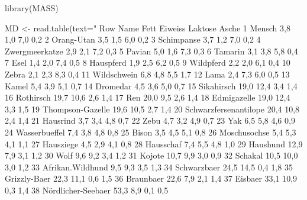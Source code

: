 \documentclass[letterpaper]{book}
\begin{document}
\begin{Examples}
\begin{ExampleCode}

library(MASS)

MD <- read.table(text="
Row  Name              Fett   Eiweiss Laktose Asche
  1  Mensch                  3,8      1,0       7,0      0,2
  2  Orang-Utan              3,5      1,5       6,0      0,2
  3  Schimpanse              3,7      1,2       7,0      0,2
  4  Zwergmeerkatze          2,9      2,1       7,2      0,3
  5  Pavian                  5,0      1,6       7,3      0,3
  6  Tamarin                 3,1      3,8       5,8      0,4
  7  Esel                    1,4      2,0       7,4      0,5
  8  Hauspferd               1,9      2,5       6,2      0,5
  9  Wildpferd               2,2      2,0       6,1      0,4
 10  Zebra                   2,1      2,3       8,3      0,4
 11  Wildschwein             6,8      4,8       5,5      1,7
 12  Lama                    2,4      7,3       6,0      0,5
 13  Kamel                   5,4      3,9       5,1      0,7
 14  Dromedar                4,5      3,6       5,0      0,7
 15  Sikahirsch             19,0     12,4       3,4      1,4
 16  Rothirsch              19,7     10,6       2,6      1,4
 17  Ren                    20,0      9,5       2,6      1,4
 18  Edmigazelle            19,0     12,4       3,3      1,5
 19  Thompson-Gazelle       19,6     10,5       2,7      1,4
 20  Schwarzfersenantilope  20,4     10,8       2,4      1,4
 21  Hausrind                3,7      3,4       4,8      0,7
 22  Zebu                    4,7      3,2       4,9      0,7
 23  Yak                     6,5      5,8       4,6      0,9
 24  Wasserbueffel            7,4      3,8       4,8      0,8
 25  Bison                   3,5      4,5       5,1      0,8
 26  Moschusochse            5,4      5,3       4,1      1,1
 27  Hausziege               4,5      2,9       4,1      0,8
 28  Hausschaf               7,4      5,5       4,8      1,0
 29  Haushund               12,9      7,9       3,1      1,2
 30  Wolf                    9,6      9,2       3,4      1,2
 31  Kojote                 10,7      9,9       3,0      0,9
 32  Schakal                10,5     10,0       3,0      1,2
 33  Afrikan.Wildhund        9,5      9,3       3,5      1,3
 34  Schwarzbaer             24,5     14,5       0,4      1,8
 35  Grizzly-Baer            22,3     11,1       0,6      1,5
 36  Braunbaer               22,6      7,9       2,1      1,4
 37  Eisbaer                 33,1     10,9       0,3      1,4
 38  Nördlicher-Seebaer      53,3      8,9       0,1      0,5

\end{ExampleCode}
\end{Examples}
\end{document}
